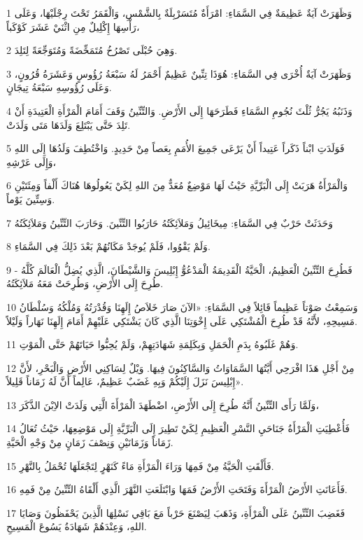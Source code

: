 \par 1 وَظَهَرَتْ آيَةٌ عَظِيمَةٌ فِي السَّمَاءِ: امْرَأَةٌ مُتَسَرْبِلَةٌ بِالشَّمْسِ، وَالْقَمَرُ تَحْتَ رِجْلَيْهَا، وَعَلَى رَأْسِهَا إِكْلِيلٌ مِنِ اثْنَيْ عَشَرَ كَوْكَباً،
\par 2 وَهِيَ حُبْلَى تَصْرُخُ مُتَمَخِّضَةً وَمُتَوَجِّعَةً لِتَلِدَ.
\par 3 وَظَهَرَتْ آيَةٌ أُخْرَى فِي السَّمَاءِ: هُوَذَا تِنِّينٌ عَظِيمٌ أَحْمَرُ لَهُ سَبْعَةُ رُؤُوسٍ وَعَشَرَةُ قُرُونٍ، وَعَلَى رُؤُوسِهِ سَبْعَةُ تِيجَانٍ.
\par 4 وَذَنَبُهُ يَجُرُّ ثُلْثَ نُجُومِ السَّمَاءِ فَطَرَحَهَا إِلَى الأَرْضِ. وَالتِّنِّينُ وَقَفَ أَمَامَ الْمَرْأَةِ الْعَتِيدَةِ أَنْ تَلِدَ حَتَّى يَبْتَلِعَ وَلَدَهَا مَتَى وَلَدَتْ.
\par 5 فَوَلَدَتِ ابْناً ذَكَراً عَتِيداً أَنْ يَرْعَى جَمِيعَ الأُمَمِ بِعَصاً مِنْ حَدِيدٍ. وَاخْتُطِفَ وَلَدُهَا إِلَى اللهِ وَإِلَى عَرْشِهِ،
\par 6 وَالْمَرْأَةُ هَرَبَتْ إِلَى الْبَرِّيَّةِ حَيْثُ لَهَا مَوْضِعٌ مُعَدٌّ مِنَ اللهِ لِكَيْ يَعُولُوهَا هُنَاكَ أَلْفاً وَمِئَتَيْنِ وَسِتِّينَ يَوْماً.
\par 7 وَحَدَثَتْ حَرْبٌ فِي السَّمَاءِ: مِيخَائِيلُ وَمَلاَئِكَتُهُ حَارَبُوا التِّنِّينَ. وَحَارَبَ التِّنِّينُ وَمَلاَئِكَتُهُ
\par 8 وَلَمْ يَقْوُوا، فَلَمْ يُوجَدْ مَكَانُهُمْ بَعْدَ ذَلِكَ فِي السَّمَاءِ.
\par 9 فَطُرِحَ التِّنِّينُ الْعَظِيمُ، الْحَيَّةُ الْقَدِيمَةُ الْمَدْعُوُّ إِبْلِيسَ وَالشَّيْطَانَ، الَّذِي يُضِلُّ الْعَالَمَ كُلَّهُ - طُرِحَ إِلَى الأَرْضِ، وَطُرِحَتْ مَعَهُ مَلاَئِكَتُهُ.
\par 10 وَسَمِعْتُ صَوْتاً عَظِيماً قَائِلاً فِي السَّمَاءِ: «الآنَ صَارَ خَلاَصُ إِلَهِنَا وَقُدْرَتُهُ وَمُلْكُهُ وَسُلْطَانُ مَسِيحِهِ، لأَنَّهُ قَدْ طُرِحَ الْمُشْتَكِي عَلَى إِخْوَتِنَا الَّذِي كَانَ يَشْتَكِي عَلَيْهِمْ أَمَامَ إِلَهِنَا نَهَاراً وَلَيْلاً.
\par 11 وَهُمْ غَلَبُوهُ بِدَمِ الْحَمَلِ وَبِكَلِمَةِ شَهَادَتِهِمْ، وَلَمْ يُحِبُّوا حَيَاتَهُمْ حَتَّى الْمَوْتِ.
\par 12 مِنْ أَجْلِ هَذَا افْرَحِي أَيَّتُهَا السَّمَاوَاتُ وَالسَّاكِنُونَ فِيهَا. وَيْلٌ لِسَاكِنِي الأَرْضِ وَالْبَحْرِ، لأَنَّ إِبْلِيسَ نَزَلَ إِلَيْكُمْ وَبِهِ غَضَبٌ عَظِيمٌ، عَالِماً أَنَّ لَهُ زَمَاناً قَلِيلاً».
\par 13 وَلَمَّا رَأَى التِّنِّينُ أَنَّهُ طُرِحَ إِلَى الأَرْضِ، اضْطَهَدَ الْمَرْأَةَ الَّتِي وَلَدَتْ الاِبْنَ الذَّكَرَ،
\par 14 فَأُعْطِيَتِ الْمَرْأَةُ جَنَاحَيِ النَّسْرِ الْعَظِيمِ لِكَيْ تَطِيرَ إِلَى الْبَرِّيَّةِ إِلَى مَوْضِعِهَا، حَيْثُ تُعَالُ زَمَاناً وَزَمَانَيْنِ وَنِصْفَ زَمَانٍ مِنْ وَجْهِ الْحَيَّةِ.
\par 15 فَأَلْقَتِ الْحَيَّةُ مِنْ فَمِهَا وَرَاءَ الْمَرْأَةِ مَاءً كَنَهْرٍ لِتَجْعَلَهَا تُحْمَلُ بِالنَّهْرِ.
\par 16 فَأَعَانَتِ الأَرْضُ الْمَرْأَةَ وَفَتَحَتِ الأَرْضُ فَمَهَا وَابْتَلَعَتِ النَّهْرَ الَّذِي أَلْقَاهُ التِّنِّينُ مِنْ فَمِهِ.
\par 17 فَغَضِبَ التِّنِّينُ عَلَى الْمَرْأَةِ، وَذَهَبَ لِيَصْنَعَ حَرْباً مَعَ بَاقِي نَسْلِهَا الَّذِينَ يَحْفَظُونَ وَصَايَا اللهِ، وَعِنْدَهُمْ شَهَادَةُ يَسُوعَ الْمَسِيحِ.

